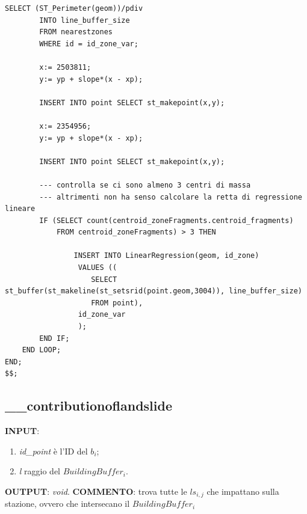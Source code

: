 \begin{lstlisting}[style = mystyle]
		SELECT (ST_Perimeter(geom))/pdiv 
		INTO line_buffer_size 
		FROM nearestzones 
		WHERE id = id_zone_var;

		x:= 2503811;
		y:= yp + slope*(x - xp);

		INSERT INTO point SELECT st_makepoint(x,y);

		x:= 2354956;
		y:= yp + slope*(x - xp);

		INSERT INTO point SELECT st_makepoint(x,y);
		
		--- controlla se ci sono almeno 3 centri di massa 
		--- altrimenti non ha senso calcolare la retta di regressione lineare
		IF (SELECT count(centroid_zoneFragments.centroid_fragments) 
			FROM centroid_zoneFragments) > 3 THEN
			
				INSERT INTO LinearRegression(geom, id_zone)
				 VALUES ((
				 	SELECT st_buffer(st_makeline(st_setsrid(point.geom,3004)), line_buffer_size) 
				 	FROM point), 
				 id_zone_var
				 );
		END IF;
	END LOOP;
END;
$$;

\end{lstlisting}

\subsection{\_\_contributionoflandslide}
\textbf{INPUT}: 
\begin{enumerate}
	\item \textit{id\_point} è l'ID del $b_i$;
	\item \textit{l} raggio del $BuildingBuffer_i$.
\end{enumerate}
\textbf{OUTPUT}: \textit{void}. \newline
\textbf{COMMENTO}: trova tutte le $ls_{i,j}$ che impattano sulla stazione, ovvero che intersecano il $BuildingBuffer_i$

